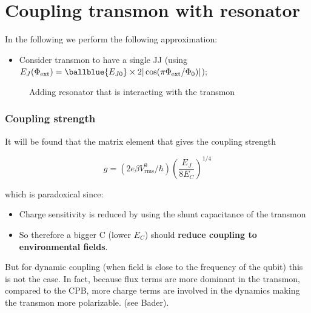 \section{Coupling transmon with resonator}

In the following we perform the following approximation:
\begin{itemize}
\item    Consider    transmon   to    have    a    single   JJ    (using
  $E_J(\Phi_{\text{ext}})        =       \ballblue{E_{J0}}        \times
  2|\cos(\pi\Phi_\text{ext}/\Phi_0)|$);
\end{itemize}

\begin{figure}[h]
  \centering {}
  \caption{\small  Adding   resonator  that  is  interacting   with  the
    transmon\label{fig:cooper_pair_box_6_cqed}}
\end{figure}

\subsubsection{Coupling strength}
\label{sec:coupling-strength}


It  will be  found  that  the matrix  element  that  gives the  coupling
strength

\begin{equation}
  g = \left( 2e\beta V_{\text{rms}}^0/\hbar \right)\left( \frac{E_{J}}{8E_{C}} \right)^{1/4}
\end{equation}

\noindent which is paradoxical since:
\begin{itemize}
\item Charge  sensitivity is reduced  by using the shunt  capacitance of
  the transmon
\item  So  therefore a  bigger  C  (lower $E_C$)  should  \textbf{reduce
    coupling to environmental fields}.
\end{itemize}

\begin{framed}\noindent

  But for dynamic coupling (when field  is close to the frequency of the
  qubit) this  is not the  case.  In fact,  because flux terms  are more
  dominant in the  transmon, compared to the CPB, more  charge terms are
  involved in  the dynamics making  the transmon more  polarizable. (see
  Bader).
\end{framed}



\newpage

